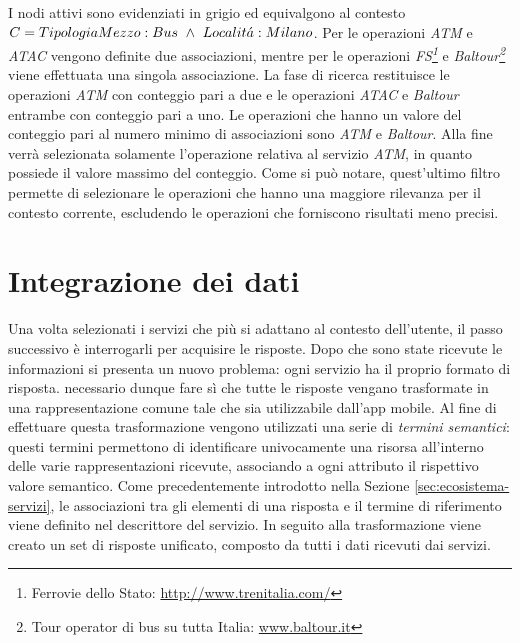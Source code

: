 I nodi attivi sono evidenziati in grigio ed equivalgono al contesto $ C = Tipologia\\Mezzo: Bus\ \land\ Localit\acute{a}: Milano $. Per le operazioni \emph{ATM} e \emph{ATAC} vengono definite due associazioni, mentre per le operazioni \emph{FS\footnote{Ferrovie dello Stato: \url{http://www.trenitalia.com/}}} e \emph{Baltour\footnote{Tour operator di bus su tutta Italia: \url{www.baltour.it}}} viene effettuata una singola associazione. La fase di ricerca restituisce le operazioni \emph{ATM} con conteggio pari a due e le operazioni \emph{ATAC} e \emph{Baltour} entrambe con conteggio pari a uno. Le operazioni che hanno un valore del conteggio pari al numero minimo di associazioni sono \emph{ATM} e \emph{Baltour}. Alla fine verrà selezionata solamente l'operazione relativa al servizio \emph{ATM}, in quanto possiede il valore massimo del conteggio. Come si può notare, quest'ultimo filtro permette di selezionare le operazioni che hanno una maggiore rilevanza per il contesto corrente, escludendo le operazioni che forniscono risultati meno precisi.

\section{Integrazione dei dati\label{sec:integrazione-dati}}

Una volta selezionati i servizi che più si adattano al contesto dell'utente, il passo successivo è interrogarli per acquisire le risposte. Dopo che sono state ricevute le informazioni si presenta un nuovo problema: ogni servizio ha il proprio formato di risposta. \upe necessario dunque fare sì che tutte le risposte vengano trasformate in una rappresentazione comune tale che sia utilizzabile dall'app mobile. Al fine di effettuare questa trasformazione vengono utilizzati una serie di \emph{termini semantici}: questi termini permettono di identificare univocamente una risorsa all'interno delle varie rappresentazioni ricevute, associando a ogni attributo il rispettivo valore semantico. Come precedentemente introdotto nella Sezione \ref{sec:ecosistema-servizi}, le associazioni tra gli elementi di una risposta e il termine di riferimento viene definito nel descrittore del servizio. In seguito alla trasformazione viene creato un set di risposte unificato, composto da tutti i dati ricevuti dai servizi.

